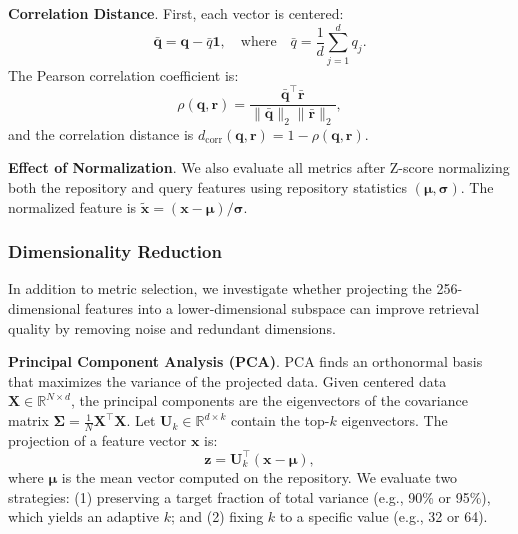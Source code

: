 \documentclass[onecolumn,a4paper,12pt]{IEEEtran}
\begin{document}
\textbf{Correlation Distance}. First, each vector is centered:
\begin{equation}
\bar{\mathbf{q}} = \mathbf{q} - \bar{q} \mathbf{1}, \quad \text{where} \quad \bar{q} = \frac{1}{d}\sum_{j=1}^{d} q_j.
\end{equation}
The Pearson correlation coefficient is:
\begin{equation}
\rho(\mathbf{q}, \mathbf{r}) = \frac{\bar{\mathbf{q}}^{\top} \bar{\mathbf{r}}}{\|\bar{\mathbf{q}}\|_2 \|\bar{\mathbf{r}}\|_2},
\end{equation}
and the correlation distance is $d_{\text{corr}}(\mathbf{q}, \mathbf{r}) = 1 - \rho(\mathbf{q}, \mathbf{r})$.

\textbf{Effect of Normalization}. We also evaluate all metrics after Z-score normalizing both the repository and query features using repository statistics $(\boldsymbol{\mu}, \boldsymbol{\sigma})$. The normalized feature is $\tilde{\mathbf{x}} = (\mathbf{x} - \boldsymbol{\mu}) / \boldsymbol{\sigma}$.

\subsubsection{Dimensionality Reduction}

In addition to metric selection, we investigate whether projecting the 256-dimensional features into a lower-dimensional subspace can improve retrieval quality by removing noise and redundant dimensions.

\textbf{Principal Component Analysis (PCA)}. PCA finds an orthonormal basis that maximizes the variance of the projected data. Given centered data $\mathbf{X} \in \mathbb{R}^{N \times d}$, the principal components are the eigenvectors of the covariance matrix $\boldsymbol{\Sigma} = \frac{1}{N} \mathbf{X}^{\top} \mathbf{X}$. Let $\mathbf{U}_k \in \mathbb{R}^{d \times k}$ contain the top-$k$ eigenvectors. The projection of a feature vector $\mathbf{x}$ is:
\begin{equation}
\mathbf{z} = \mathbf{U}_k^{\top} (\mathbf{x} - \boldsymbol{\mu}),
\end{equation}
where $\boldsymbol{\mu}$ is the mean vector computed on the repository. We evaluate two strategies: (1) preserving a target fraction of total variance (e.g., 90\% or 95\%), which yields an adaptive $k$; and (2) fixing $k$ to a specific value (e.g., 32 or 64).
\end{document}
